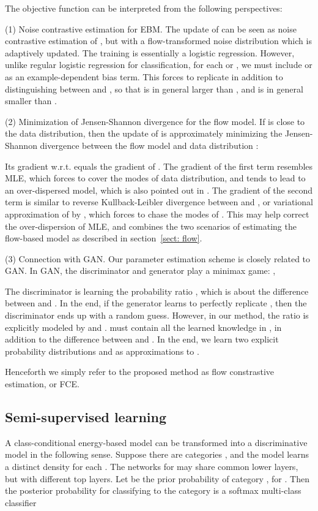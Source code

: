\documentclass[10pt,twocolumn,letterpaper]{article}
\begin{document}
The objective function can be interpreted from the following perspectives:

(1) Noise contrastive estimation for EBM. The update of  can be seen as noise contrastive estimation of , but with a flow-transformed noise distribution  which is adaptively updated. The training is essentially a logistic regression. However, unlike regular logistic regression for classification, for each  or , we must include  or  as an example-dependent bias term. This forces  to replicate  in addition to distinguishing between  and , so that  is in general larger than , and  is in general smaller than . 

(2) Minimization of Jensen-Shannon divergence for the flow model. If  is close to the data distribution, then the update of  is approximately minimizing the Jensen-Shannon divergence between the flow model  and data distribution : 

Its gradient w.r.t.  equals the gradient of . The gradient of the first term resembles MLE, which forces  to cover the modes of data distribution, and tends to lead to an over-dispersed model, which is also pointed out in \cite{kingma2018Glow}. The gradient of the second term is similar to reverse Kullback-Leibler divergence between  and , or variational approximation of  by , which forces  to chase the modes of  \cite{murphy2012machine,fox2012tutorial}. This may help correct the over-dispersion of MLE, and combines the two scenarios of estimating the flow-based model  as described in section~\ref{sect: flow}.  

(3) Connection with GAN. 
Our parameter estimation scheme is closely related to GAN. In GAN, the discriminator  and generator  play a minimax game: ,

 The discriminator  is learning the probability ratio 
 	 ,
 which is about the difference between  and  \cite{finn2016connection}. In the end, if the generator  learns to perfectly replicate , then the discriminator  ends up with a random guess. However, in our method, the  ratio is explicitly modeled by  and .  must contain all the learned knowledge in , in addition to the difference between  and . In the end, we learn two explicit probability distributions  and  as approximations to .  
 
Henceforth we simply refer to the proposed method as flow constrastive estimation, or FCE. 

\subsection{Semi-supervised learning}
\label{sect: semi}
A class-conditional energy-based model can be transformed into a discriminative model in the following sense. Suppose there are  categories , and the model learns a distinct density  for each . The networks  for  may share common lower layers, but with different top layers. Let  be the prior probability of category , for . Then the posterior probability for classifying  to the category  is a softmax multi-class classifier
\end{document}
